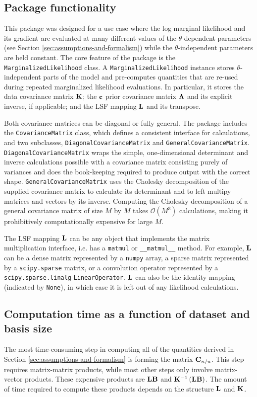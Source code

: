 \documentclass[trackchanges]{aastex62}
\newcommand{\vx}[1]{{\bf {#1}}}
\begin{document}
\subsection{Package functionality}
\label{sec:package-functionality}
This package was designed for a use case where the log marginal likelihood and its gradient are evaluated at many different values of the $\theta$-dependent parameters (see Section \ref{sec:assumptions-and-formalism}) while the $\theta$-independent parameters are held constant.
The core feature of the package is the \texttt{MarginalizedLikelihood} class.
A \texttt{MarginalizedLikelihood} instance stores $\theta$-independent parts of the model and pre-computes quantities that are re-used during repeated marginalized likelihood evaluations.
In particular, it stores the data covariance matrix $\vx{K}$; the $\vx{c}$ prior covariance matrix $\vx{\Lambda}$ and its explicit inverse, if applicable; and the LSF mapping $\vx{L}$ and its transpose.

Both covariance matrices can be diagonal or fully general.
The package includes the \texttt{CovarianceMatrix} class, which defines a consistent interface for calculations, and two subclasses, \texttt{DiagonalCovarianceMatrix} and \texttt{GeneralCovarianceMatrix}.
\texttt{DiagonalCovarianceMatrix} wraps the simple, one-dimensional determinant and inverse calculations possible with a covariance matrix consisting purely of variances and does the book-keeping required to produce output with the correct shape.
\texttt{GeneralCovarianceMatrix} uses the Cholesky decomposition of the supplied covariance matrix to calculate its determinant and to left multipy matrices and vectors by its inverse.
Computing the Cholesky decomposition of a general covariance matrix of size $M$ by $M$ takes $\mathcal{O}(M^3)$ calculations, making it prohibitively computationally expensive for large $M$.

The LSF mapping $\vx{L}$ can be any object that implements the matrix multiplication interface, i.e. has a \texttt{matmul} or \texttt{\_\_matmul\_\_} method.
For example, $\vx{L}$ can be a dense matrix represented by a \texttt{numpy} array, a sparse matrix represented by a \texttt{scipy.sparse} matrix, or a convolution operator represented by a \texttt{scipy.sparse.linalg} \texttt{LinearOperator}.
$\vx{L}$ can also be the identity mapping (indicated by \texttt{None}), in which case it is left out of any likelihood calculations.


\subsection{Computation time as a function of dataset and basis size}
\label{sec:scaling}
The most time-consuming step in computing all of the quantities derived in Section \ref{sec:assumptions-and-formalism} is forming the matrix $\vx{C}_{n/u}$.
This step requires matrix-matrix products, while most other steps only involve matrix-vector products.
These expensive products are $\vx{L}\vx{B}$ and $\vx{K}^{-1} \left(\vx{L} \vx{B}\right)$.
The amount of time required to compute these products depends on the structure $\vx{L}$ and $\vx{K}$.
\end{document}
